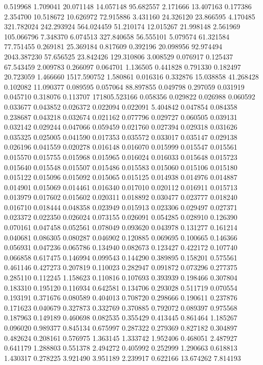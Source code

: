 0.519968
1.709041
20.071148
14.057148
95.682557
2.171666
13.407163
0.177386
2.354700
10.518672
10.626972
72.915886
3.431160
24.326120
23.866595
4.170485
321.782024
242.293924
564.024459
51.210174
12.015267
21.998148
2.561969
105.066796
7.348370
6.074513
327.840658
56.555101
5.079574
61.321584
77.751455
0.269181
25.369184
0.817609
0.392196
20.098956
92.974494
2043.387230
57.656525
23.842426
129.310806
3.008529
0.076917
0.125437
67.543459
2.009783
0.266097
0.064701
1.136505
0.441828
0.791330
0.182497
20.723059
1.466660
1517.590752
1.580861
0.016316
0.332876
15.038858
41.268428
0.102082
11.090377
0.089595
0.057064
88.897855
0.049798
0.297059
0.031919
0.045710
0.318076
0.113707
171805.523166
0.058356
0.029822
0.026988
0.060592
0.033677
0.043852
0.026372
0.022094
0.022091
5.404842
0.047854
0.084358
0.238687
0.043218
0.032674
0.021162
0.077796
0.029727
0.060505
0.039131
0.032142
0.029244
0.047066
0.059459
0.021760
0.027394
0.029318
0.031626
0.035325
0.025005
0.041590
0.017353
0.035572
0.033017
0.035147
0.029138
0.026196
0.041559
0.020278
0.016148
0.016070
0.015999
0.015547
0.015561
0.015570
0.015755
0.015968
0.015965
0.016024
0.016033
0.015648
0.015723
0.015640
0.015548
0.015507
0.015486
0.015583
0.015060
0.015106
0.015180
0.015122
0.015096
0.015092
0.015065
0.015125
0.014938
0.014976
0.014887
0.014901
0.015069
0.014461
0.016340
0.017010
0.020112
0.016911
0.015713
0.013979
0.017602
0.015602
0.020311
0.018892
0.030477
0.023777
0.018240
0.016710
0.018444
0.048358
0.023949
0.015913
0.023306
0.029497
0.027371
0.023372
0.022350
0.026024
0.073155
0.026091
0.054285
0.028910
0.126390
0.070161
0.047458
0.052561
0.078049
0.093620
0.043978
0.131277
0.161214
0.040681
0.086305
0.080287
0.046902
0.120885
0.069695
0.100665
0.146366
0.056931
0.047236
0.065786
0.134940
0.082673
0.123427
0.422172
0.107740
0.066858
0.617475
0.146994
0.099543
0.144290
0.389895
0.158201
0.575561
0.461146
0.427273
0.207819
0.110023
0.282947
0.091872
0.073296
0.277375
0.285110
0.112245
1.158623
0.110816
0.107693
0.393939
0.198466
0.307804
0.183310
0.195120
0.116934
0.642581
0.134706
0.293028
0.511719
0.070554
0.193191
0.371676
0.080589
0.404013
0.708720
0.298666
0.190611
0.237876
0.171623
0.040679
0.327873
0.332769
0.370885
0.792072
0.089397
0.975568
0.187963
0.149189
0.460698
0.082535
0.355429
0.413445
0.861464
1.185267
0.096020
0.989377
0.845134
0.675997
0.287322
0.279369
0.827182
0.304897
0.482624
0.208161
0.576975
1.363145
1.333742
1.952406
0.468051
2.487927
0.641179
1.288803
0.551378
2.494272
0.405992
0.252999
1.290663
0.618813
1.430317
0.278225
3.921490
3.951189
2.239917
0.622166
13.674262
7.814193
